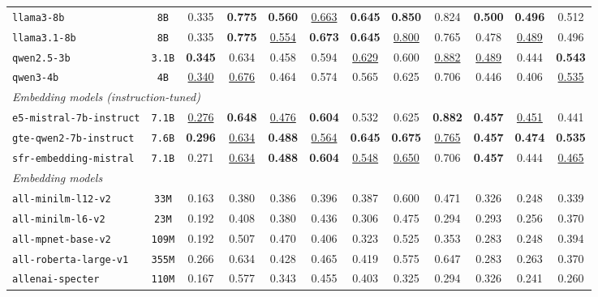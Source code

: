 \documentclass[11pt]{article}
\begin{document}
\begin{table}[htbp]
{\begin{tabular}{lccccccccccc}
\texttt{llama3-8b} & \texttt{8B} & 0.335 & \textbf{0.775} & \textbf{0.560} & \underline{0.663} & \textbf{0.645} & \textbf{0.850} & 0.824 & \textbf{0.500} & \textbf{0.496} & 0.512 \\
\texttt{llama3.1-8b} & \texttt{8B} & 0.335 & \textbf{0.775} & \underline{0.554} & \textbf{0.673} & \textbf{0.645} & \underline{0.800} & 0.765 & 0.478 & \underline{0.489} & 0.496 \\
\texttt{qwen2.5-3b} & \texttt{3.1B} & \textbf{0.345} & 0.634 & 0.458 & 0.594 & \underline{0.629} & 0.600 & \underline{0.882} & \underline{0.489} & 0.444 & \textbf{0.543} \\
\texttt{qwen3-4b} & \texttt{4B} & \underline{0.340} & \underline{0.676} & 0.464 & 0.574 & 0.565 & 0.625 & 0.706 & 0.446 & 0.406 & \underline{0.535} \\
\midrule
\multicolumn{12}{l}{\textit{Embedding models (instruction-tuned)}} \\
\midrule
\texttt{e5-mistral-7b-instruct} & \texttt{7.1B} & \underline{0.276} & \textbf{0.648} & \underline{0.476} & \textbf{0.604} & 0.532 & 0.625 & \textbf{0.882} & \textbf{0.457} & \underline{0.451} & 0.441 \\
\texttt{gte-qwen2-7b-instruct} & \texttt{7.6B} & \textbf{0.296} & \underline{0.634} & \textbf{0.488} & \underline{0.564} & \textbf{0.645} & \textbf{0.675} & \underline{0.765} & \textbf{0.457} & \textbf{0.474} & \textbf{0.535} \\
\texttt{sfr-embedding-mistral} & \texttt{7.1B} & 0.271 & \underline{0.634} & \textbf{0.488} & \textbf{0.604} & \underline{0.548} & \underline{0.650} & 0.706 & \textbf{0.457} & 0.444 & \underline{0.465} \\
\midrule
\multicolumn{12}{l}{\textit{Embedding models}} \\
\midrule
\texttt{all-minilm-l12-v2} & \texttt{33M} & 0.163 & 0.380 & 0.386 & 0.396 & 0.387 & 0.600 & 0.471 & 0.326 & 0.248 & 0.339 \\
\texttt{all-minilm-l6-v2} & \texttt{23M} & 0.192 & 0.408 & 0.380 & 0.436 & 0.306 & 0.475 & 0.294 & 0.293 & 0.256 & 0.370 \\
\texttt{all-mpnet-base-v2} & \texttt{109M} & 0.192 & 0.507 & 0.470 & 0.406 & 0.323 & 0.525 & 0.353 & 0.283 & 0.248 & 0.394 \\
\texttt{all-roberta-large-v1} & \texttt{355M} & 0.266 & 0.634 & 0.428 & 0.465 & 0.419 & 0.575 & 0.647 & 0.283 & 0.263 & 0.370 \\
\texttt{allenai-specter} & \texttt{110M} & 0.167 & 0.577 & 0.343 & 0.455 & 0.403 & 0.325 & 0.294 & 0.326 & 0.241 & 0.260 \\

\end{tabular}}
\end{table}
\end{document}
